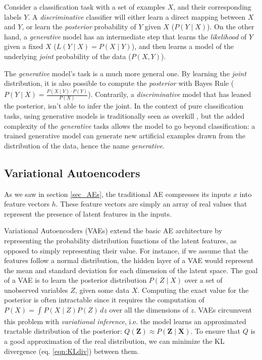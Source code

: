 \documentclass{article}
\begin{document}
Consider a classification task with a set of examples $X$, and their corresponding labels $Y$.
A \textit{discriminative} classifier will either learn a direct mapping between $X$ and $Y$, or learn the \textit{posterior} probability of $Y$ given $X$ ($P(Y \mid X)$).
On the other hand, a \textit{generative} model has an intermediate step that learns the \textit{likelihood} of $Y$ given a fixed $X$ ($L(Y \mid X) = P(X \mid Y)$), and then learns a model of the underlying \textit{joint} probability of the data ($P(X ,Y)$).

The \textit{generative} model's task is a  much more general one. By learning the \textit{joint} distribution, it is also possible to compute the \textit{posterior} with Bayes Rule ($P(Y \mid X)=\frac{P(X \mid Y) \cdot P(Y)}{P(X)}$). Contrarily, a \textit{discriminative} model that has leaned the posterior, isn't able to infer the joint.
In the context of pure classification tasks, using generative models is traditionally seen as overkill \cite{vapnik2013nature}, but the added complexity of the \textit{generative} tasks allows the model to go beyond classification: a trained generative model can generate new artificial examples drawn from the distribution of the data, hence the name \textit{generative}.

\subsection{Variational Autoencoders}
As we saw in section \ref{sec_AEs}, the traditional AE compresses its inputs $x$ into  feature vectors $h$. These feature vectors are simply an array of real values that represent the presence of latent features in the inputs.

Variational Autoencoders (VAEs) extend the basic AE architecture by representing the probability distribution functions of the latent features, as opposed to simply representing their value. For instance, if we assume that the features follow a normal distribution, the hidden layer of a VAE would represent the mean and standard deviation for each dimension of the latent space. The goal of a VAE is to learn the posterior distribution \(P(Z \mid X)\) over a set of unobserved variables $Z$, given some data $X$. Computing the exact value for the posterior is often intractable since it requires the computation of \(P(X)=\int_{}^{} P(X \mid Z)P(Z) \,dz\) over all the dimensions of $z$. VAEs circumvent this problem with \textit{variational inference}, i.e. the model learns an approximated tractable distribution of the posterior: \( Q(\mathbf{Z}) \approx P(\mathbf{Z} \mid \mathbf{X})\). To ensure that $Q$ is a good approximation of the real distribution, we can minimize the KL divergence (eq. \ref{eqn:KLdiv}) between them.
\end{document}
